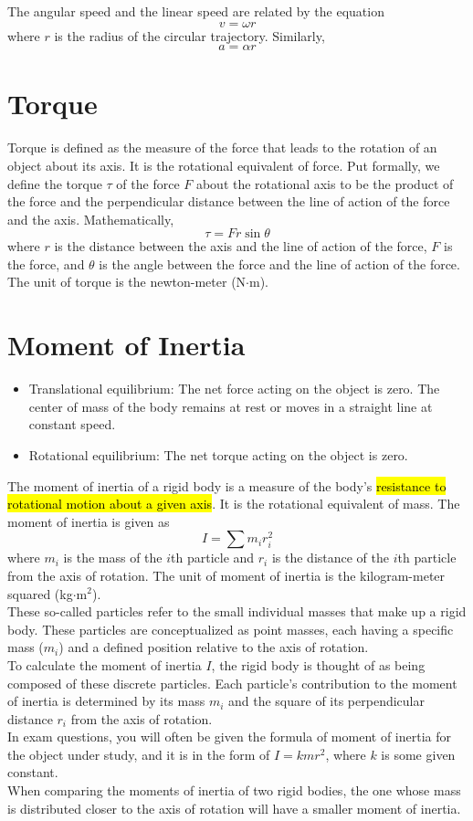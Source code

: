 \documentclass[a4paper,12pt]{article}
\let\oldsection\section
\renewcommand\section{\clearpage\oldsection}
\newcommand{\lb}{\\[8pt]}
\begin{document}
The angular speed and the linear speed are related by the equation $$v = \omega r$$where $r$ is the radius of the circular trajectory. Similarly, $$a = \alpha r$$

\section{Torque}

Torque is defined as the measure of the force that leads to the rotation of an object about its axis. It is the rotational equivalent of force. Put formally, we define the torque $\tau$ of the force $F$ about the rotational axis to be the product of the force and the perpendicular distance between the line of action of
the force and the axis. Mathematically, $$\tau = Fr\sin\theta$$where $r$ is the distance between the axis and the line of action of the force, $F$ is the force, and $\theta$ is the angle between the force and the line of action of the force. The unit of torque is the newton-meter (N$\cdot$m).

\section{Moment of Inertia}

\begin{itemize}
  \item Translational equilibrium: The net force acting on the object is zero. The center of mass of the body remains at rest or moves in a straight line at constant speed.
  \item Rotational equilibrium: The net torque acting on the object is zero.
\end{itemize}

The moment of inertia of a rigid body is a measure of the body's \hl{resistance to rotational motion about a given axis}. It is the rotational equivalent of mass. The moment of inertia is given as $$I = \sum m_ir_i^2$$where $m_i$ is the mass of the $i$th particle and $r_i$ is the distance of the $i$th particle from the axis of rotation. The unit of moment of inertia is the kilogram-meter squared (kg$\cdot$m$^2$).\lb
These so-called particles refer to the small individual masses that make up a rigid body. These particles are conceptualized as point masses, each having a specific mass ($m_i$) and a defined position relative to the axis of rotation.\lb
To calculate the moment of inertia $I$, the rigid body is thought of as being composed of these discrete particles. Each particle's contribution to the moment of inertia is determined by its mass $m_i$ and the square of its perpendicular distance $r_i$ from the axis of rotation.\lb
In exam questions, you will often be given the formula of moment of inertia for the object under study, and it is in the form of $I = kmr^2$, where $k$ is some given constant.\lb
When comparing the moments of inertia of two rigid bodies, the one whose mass is distributed closer to the axis of rotation will have a smaller moment of inertia.
\end{document}
